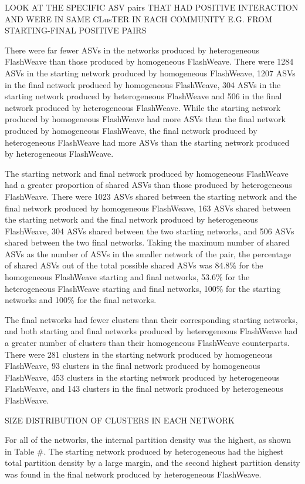 \documentclass[11pt]{article}
\begin{document}
LOOK AT THE SPECIFIC ASV pairs THAT HAD POSITIVE INTERACTION AND WERE IN SAME CLusTER IN EACH COMMUNITY E.G. FROM STARTING-FINAL POSITIVE PAIRS

There were far fewer ASVs in the networks produced by heterogeneous FlashWeave than those produced by homogeneous FlashWeave. There were 1284 ASVs in the starting network produced by homogeneous FlashWeave, 1207 ASVs in the final network produced by homogeneous FlashWeave, 304 ASVs in the starting network produced by heterogeneous FlashWeave and 506 in the final network produced by heterogeneous FlashWeave. While the starting network produced by homogeneous FlashWeave had more ASVs than the final network produced by homogeneous FlashWeave, the final network produced by heterogeneous FlashWeave had more ASVs than the starting network produced by heterogeneous FlashWeave.

The starting network and final network produced by homogeneous FlashWeave had a greater proportion of shared ASVs than those produced by heterogeneous FlashWeave. There were 1023 ASVs shared between the starting network and the final network produced by homogeneous FlashWeave, 163 ASVs shared between the starting network and the final network produced by heterogeneous FlashWeave, 304 ASVs shared between the two starting networks, and 506 ASVs shared between the two final networks. Taking the maximum number of shared ASVs as the number of ASVs in the smaller network of the pair, the percentage of shared ASVs out of the total possible shared ASVs was 84.8\% for the homogeneous FlashWeave starting and final networks, 53.6\% for the heterogeneous FlashWeave starting and final networks, 100\% for the starting networks and 100\% for the final networks.

The final networks had fewer clusters than their corresponding starting networks, and both starting and final networks produced by heterogeneous FlashWeave had a greater number of clusters than their homogeneous FlashWeave counterparts. There were 281 clusters in the starting network produced by homogeneous FlashWeave, 93 clusters in the final network produced by homogeneous FlashWeave, 453 clusters in the starting network produced by heterogeneous FlashWeave, and 143 clusters in the final network produced by heterogeneous FlashWeave.

SIZE DISTRIBUTION OF CLUSTERS IN EACH NETWORK

For all of the networks, the internal partition density was the highest, as shown in Table #. The starting network produced by heterogeneous had the highest total partition density by a large margin, and the second highest partition density was found in the final network produced by heterogeneous FlashWeave.
\end{document}
